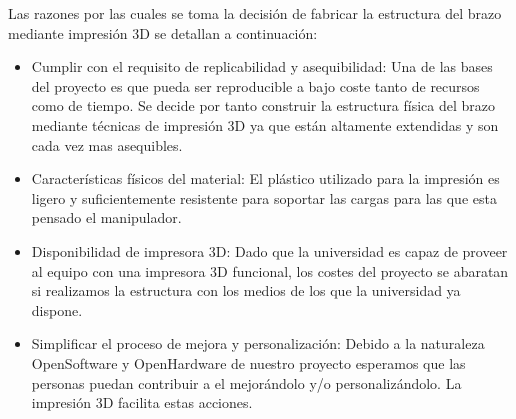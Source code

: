 Las razones por las cuales se toma la decisión de fabricar la estructura del brazo mediante impresión 3D se detallan a continuación:

\begin{itemize}
  \item Cumplir con el requisito de replicabilidad y asequibilidad: Una de las bases del proyecto es que pueda ser reproducible a bajo coste tanto de recursos como de tiempo. Se decide por tanto construir la estructura física del brazo mediante técnicas de impresión 3D ya que están altamente extendidas y son cada vez mas asequibles.
  
  \item Características físicos del material: El plástico utilizado para la impresión es ligero y suficientemente resistente para soportar las cargas para las que esta pensado el manipulador.
  
  \item Disponibilidad de impresora 3D: Dado que la universidad es capaz de proveer al equipo con una impresora 3D funcional, los costes del proyecto se abaratan si realizamos la estructura con los medios de los que la universidad ya dispone.
  
  \item Simplificar el proceso de mejora y personalización: Debido a la naturaleza OpenSoftware y OpenHardware de nuestro proyecto esperamos que las personas puedan contribuir a el mejorándolo y/o personalizándolo. La impresión 3D facilita estas acciones.
\end{itemize}

